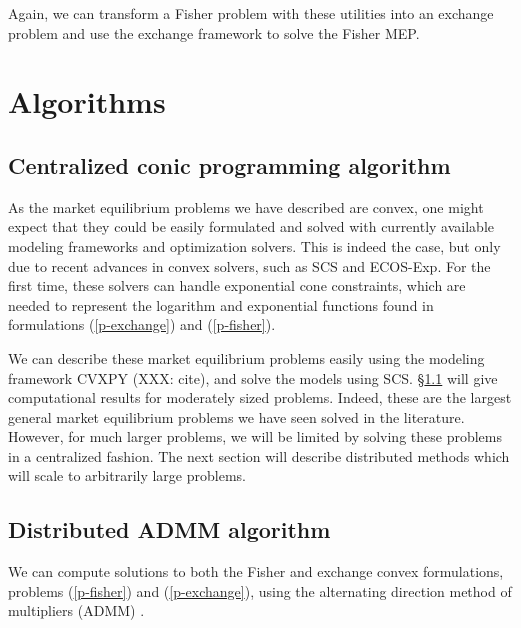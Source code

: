 \documentclass[12pt]{article}
\begin{document}
Again, we can transform a Fisher problem with these utilities into
an exchange problem and use the exchange framework to solve
the Fisher MEP.

\section{Algorithms}
\label{sec:algorithms}
\subsection{Centralized conic programming algorithm}
\label{sec:centralized}

As the market equilibrium problems we have described are convex, one might expect that they could be easily formulated and solved with currently
available modeling frameworks and optimization solvers.
This is indeed the case, but only due to recent advances in convex solvers,
such as SCS and ECOS-Exp. %
For the first time, these solvers can handle exponential cone constraints,
which are needed to represent the logarithm and exponential functions found in 
formulations (\ref{p-exchange}) and (\ref{p-fisher}).

We can describe these market equilibrium problems easily using the modeling
framework CVXPY (XXX: cite), and solve the models using SCS. \S\ref{sec:centralized} will give computational results for moderately sized problems. Indeed, these are the largest general market equilibrium problems we have seen solved in the literature. However, for much larger problems, we will
be limited by solving these problems in a centralized fashion. The next section will describe distributed methods which will scale to arbitrarily large problems.


\subsection{Distributed ADMM algorithm}
\label{sec:distributed}

We can compute solutions to both the Fisher and exchange convex
formulations, problems (\ref{p-fisher}) and (\ref{p-exchange}), using
the alternating direction method of multipliers (ADMM) \cite{boyd2011distributed, parikh2013proximal}.
\end{document}
